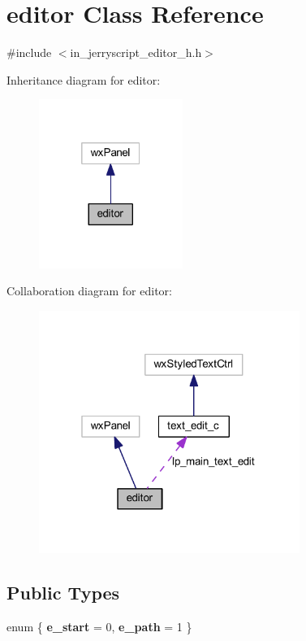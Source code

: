 \section{editor Class Reference}
\label{classeditor}


{\ttfamily \#include $<$in\+\_\+jerryscript\+\_\+editor\+\_\+h.\+h$>$}



Inheritance diagram for editor\+:
\nopagebreak
\begin{figure}[H]
\begin{center}
\leavevmode
\includegraphics[width=133pt]{classeditor__inherit__graph}
\end{center}
\end{figure}


Collaboration diagram for editor\+:
\nopagebreak
\begin{figure}[H]
\begin{center}
\leavevmode
\includegraphics[width=241pt]{classeditor__coll__graph}
\end{center}
\end{figure}
\subsection*{Public Types}
\begin{DoxyCompactItemize}
\item 
\mbox{\label{classeditor_adc29c2ff13d900c2f185ee95427fb06c}} 
enum \{ {\bfseries e\+\_\+start} = 0, 
{\bfseries e\+\_\+path} = 1
 \}
\end{DoxyCompactItemize}
